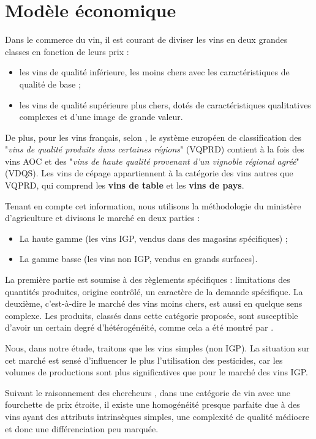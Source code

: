 \documentclass[11pt, a4paper]{article}
\begin{document}
\section*{Modèle économique}
Dans le commerce du vin, il est courant de diviser les vins en deux grandes classes en fonction de leurs prix \cite{cembalo2014} : 
\begin{itemize}
    \item les vins de qualité inférieure, les moins chers avec les caractéristiques de qualité de base ;
    \item les vins de qualité supérieure plus chers, dotés de caractéristiques qualitatives complexes et d'une image de grande valeur.
\end{itemize} %
\par
De plus, pour les vins français, selon \citet{steiner2004}, le système européen de classification des "\textit{vins de qualité produits dans certaines régions}" (VQPRD) contient à la fois des vins AOC et des "\textit{vins de haute qualité provenant d'un vignoble régional agréé}" (VDQS). 
Les vins de cépage appartiennent à la catégorie des vins autres que VQPRD, qui comprend les \textbf{vins de table} et les \textbf{vins de pays}.
\par
Tenant en compte cet information, nous utilisons la méthodologie du ministère d'agriculture et divisons le marché en deux parties :
\begin{itemize}
    \item La haute gamme (les vins IGP, vendus dans des magasins spécifiques) ;
    \item La gamme basse (les vins non IGP, vendus en grands surfaces).
\end{itemize}
\par
La première partie est soumise à des règlements spécifiques : limitations des quantités produites, origine contrôlé, un caractère de la demande spécifique. 
La deuxième, c'est-à-dire le marché des vins moins chers, est aussi en quelque sens complexe. Les produits, classés dans cette catégorie proposée, sont susceptible d'avoir un certain degré d'hétérogénéité, comme cela a été montré par \citet{cembalo2014}.
\par
Nous, dans notre étude, traitons que les vins simples (non IGP). 
La situation sur cet marché est sensé d'influencer le plus l'utilisation des pesticides, car les volumes de productions sont plus significatives que pour le marché des vins IGP.
\par 
Suivant le raisonnement des chercheurs \cite{cembalo2014}, dans une catégorie de vin avec une fourchette de prix étroite, il existe une homogénéité presque parfaite due à des vins ayant des attributs intrinsèques simples, une complexité de qualité médiocre et donc une différenciation peu marquée.
\end{document}
